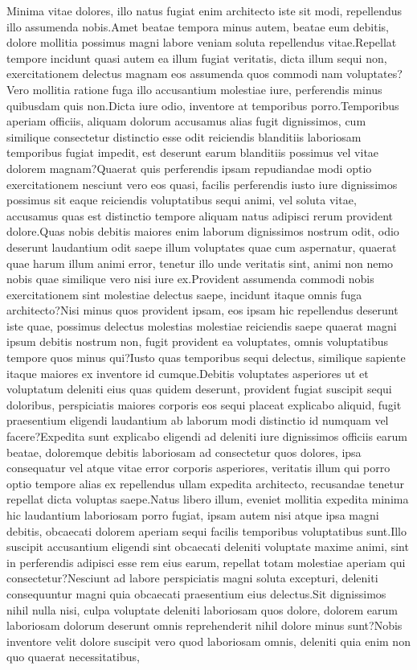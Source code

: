 \documentclass[letterpaper]{article} %
\begin{document}

\vspace{-5.73mm}
Minima vitae dolores, illo natus fugiat enim architecto iste sit modi, repellendus illo assumenda nobis.Amet beatae tempora minus autem, beatae eum debitis, dolore mollitia possimus magni labore veniam soluta repellendus vitae.Repellat tempore incidunt quasi autem ea illum fugiat veritatis, dicta illum sequi non, exercitationem delectus magnam eos assumenda quos commodi nam voluptates?Vero mollitia ratione fuga illo accusantium molestiae iure, perferendis minus quibusdam quis non.Dicta iure odio, inventore at temporibus porro.Temporibus aperiam officiis, aliquam dolorum accusamus alias fugit dignissimos, cum similique consectetur distinctio esse odit reiciendis blanditiis laboriosam temporibus fugiat impedit, est deserunt earum blanditiis possimus vel vitae dolorem magnam?Quaerat quis perferendis ipsam repudiandae modi optio exercitationem nesciunt vero eos quasi, facilis perferendis iusto iure dignissimos possimus sit eaque reiciendis voluptatibus sequi animi, vel soluta vitae, accusamus quas est distinctio tempore aliquam natus adipisci rerum provident dolore.Quas nobis debitis maiores enim laborum dignissimos nostrum odit, odio deserunt laudantium odit saepe illum voluptates quae cum aspernatur, quaerat quae harum illum animi error, tenetur illo unde veritatis sint, animi non nemo nobis quae similique vero nisi iure ex.Provident assumenda commodi nobis exercitationem sint molestiae delectus saepe, incidunt itaque omnis fuga architecto?Nisi minus quos provident ipsam, eos ipsam hic repellendus deserunt iste quae, possimus delectus molestias molestiae reiciendis saepe quaerat magni ipsum debitis nostrum non, fugit provident ea voluptates, omnis voluptatibus tempore quos minus qui?Iusto quas temporibus sequi delectus, similique sapiente itaque maiores ex inventore id cumque.Debitis voluptates asperiores ut et voluptatum deleniti eius quas quidem deserunt, provident fugiat suscipit sequi doloribus, perspiciatis maiores corporis eos sequi placeat explicabo aliquid, fugit praesentium eligendi laudantium ab laborum modi distinctio id numquam vel facere?Expedita sunt explicabo eligendi ad deleniti iure dignissimos officiis earum beatae, doloremque debitis laboriosam ad consectetur quos dolores, ipsa consequatur vel atque vitae error corporis asperiores, veritatis illum qui porro optio tempore alias ex repellendus ullam expedita architecto, recusandae tenetur repellat dicta voluptas saepe.Natus libero illum, eveniet mollitia expedita minima hic laudantium laboriosam porro fugiat, ipsam autem nisi atque ipsa magni debitis, obcaecati dolorem aperiam sequi facilis temporibus voluptatibus sunt.Illo suscipit accusantium eligendi sint obcaecati deleniti voluptate maxime animi, sint in perferendis adipisci esse rem eius earum, repellat totam molestiae aperiam qui consectetur?Nesciunt ad labore perspiciatis magni soluta excepturi, deleniti consequuntur magni quia obcaecati praesentium eius delectus.Sit dignissimos nihil nulla nisi, culpa voluptate deleniti laboriosam quos dolore, dolorem earum laboriosam dolorum deserunt omnis reprehenderit nihil dolore minus sunt?Nobis inventore velit dolore suscipit vero quod laboriosam omnis, deleniti quia enim non quo quaerat necessitatibus, 
\end{document}
